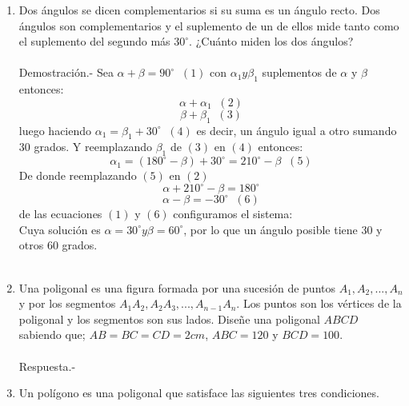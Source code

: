 \documentclass[10pt]{article}
\begin{document}
\begin{enumerate}
	\item Dos ángulos se dicen complementarios si su suma es un ángulo recto. Dos ángulos son complementarios y el suplemento de un de ellos mide tanto como el suplemento del segundo más $30^{\circ}$. ¿Cuánto miden los dos ángulos?\\\\
	    Demostración.-\; Sea $\alpha + \beta = 90^{\circ}\;\; (1)$ con $\alpha_1 y \beta_1$ suplementos de $\alpha$ y $\beta$ entonces: $$\alpha + \alpha_1\;\; (2)$$ 
	    $$\beta + \beta_1\;\; (3)$$ luego haciendo $\alpha_1 = \beta_1 + 30^{\circ}\;\; (4)$ es decir, un ángulo igual a otro sumando $30$ grados. Y reemplazando $\beta_1$ de $(3)$ en $(4)$ entonces: 
	    $$\alpha_1 = (180^{\circ} - \beta) + 30^{\circ} = 210^{\circ} - \beta \;\; (5)$$ De donde reemplazando $(5)$ en $(2)$ 
	    $$\alpha + 210^{\circ} - \beta = 180^{\circ}$$ 
	    $$\alpha - \beta = -30^{\circ}\;\; (6)$$ de las ecuaciones $(1)$ y $(6)$ configuramos el sistema:\\
	    Cuya solución es $\alpha = 30^{\circ} y \beta = 60^{\circ}$, por lo que un ángulo posible tiene $30$ y otros $60$ grados.\\\\

	\item Una poligonal es una figura formada por una sucesión de puntos $A_1,A_2,...,A_n$ y por los segmentos $A_1A_2,A_2A_3,...,A_{n-1}A_n$. Los puntos son los vértices de la poligonal y los segmentos son sus lados. Diseñe una poligonal $ABCD$ sabiendo que; $AB=BC=CD=2cm$, $ABC=120$ y $BCD=100$.\\\\
	Respuesta.-\; 

	    \begin{center}
	    \end{center}

	\item Un polígono es una poligonal que satisface las siguientes tres condiciones.
	    \begin{enumerate}[\bfseries a)]


\end{enumerate}
\end{enumerate}
\end{document}
